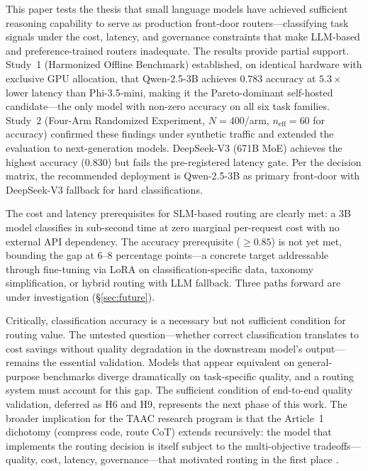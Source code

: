 \documentclass{article}
\newcommand{\taac}{\textsc{TAAC}}
\begin{document}
This paper tests the thesis that small language models have achieved sufficient reasoning capability to serve as production front-door routers---classifying task signals under the cost, latency, and governance constraints that make LLM-based and preference-trained routers inadequate. The results provide partial support. Study~1 (Harmonized Offline Benchmark) established, on identical hardware with exclusive GPU allocation, that Qwen-2.5-3B achieves $0.783$ accuracy at $5.3\times$ lower latency than Phi-3.5-mini, making it the Pareto-dominant self-hosted candidate---the only model with non-zero accuracy on all six task families. Study~2 (Four-Arm Randomized Experiment, $N = 400$/arm, $n_{\text{eff}} = 60$ for accuracy) confirmed these findings under synthetic traffic and extended the evaluation to next-generation models. DeepSeek-V3 (671B MoE) achieves the highest accuracy ($0.830$) but fails the pre-registered latency gate. Per the decision matrix, the recommended deployment is Qwen-2.5-3B as primary front-door with DeepSeek-V3 fallback for hard classifications.

The cost and latency prerequisites for SLM-based routing are clearly met: a 3B model classifies in sub-second time at zero marginal per-request cost with no external API dependency. The accuracy prerequisite ($\geq 0.85$) is not yet met, bounding the gap at 6--8 percentage points---a concrete target addressable through fine-tuning via LoRA on classification-specific data, taxonomy simplification, or hybrid routing with LLM fallback. Three paths forward are under investigation (\S\ref{sec:future}).

Critically, classification accuracy is a necessary but not sufficient condition for routing value. The untested question---whether correct classification translates to cost savings without quality degradation in the downstream model's output---remains the essential validation. Models that appear equivalent on general-purpose benchmarks diverge dramatically on task-specific quality, and a routing system must account for this gap. The sufficient condition of end-to-end quality validation, deferred as H6 and H9, represents the next phase of this work. The broader implication for the \taac{} research program is that the Article~1 dichotomy (compress code, route CoT) extends recursively: the model that implements the routing decision is itself subject to the multi-objective tradeoffs---quality, cost, latency, governance---that motivated routing in the first place \citep{sculley2015debt,kohavi2020trustworthy}.
\end{document}
